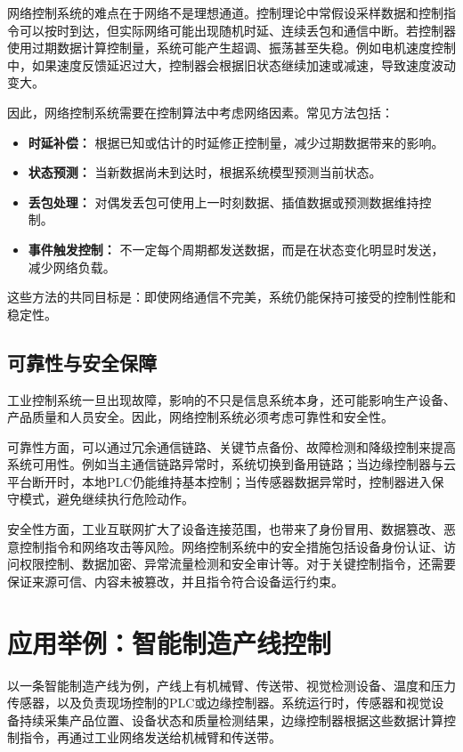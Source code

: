 \documentclass[UTF8,a4paper,zihao=-4]{ctexart}
\begin{document}
网络控制系统的难点在于网络不是理想通道。控制理论中常假设采样数据和控制指令可以按时到达，但实际网络可能出现随机时延、连续丢包和通信中断。若控制器使用过期数据计算控制量，系统可能产生超调、振荡甚至失稳。例如电机速度控制中，如果速度反馈延迟过大，控制器会根据旧状态继续加速或减速，导致速度波动变大。

因此，网络控制系统需要在控制算法中考虑网络因素。常见方法包括：

\begin{itemize}
  \item \textbf{时延补偿：} 根据已知或估计的时延修正控制量，减少过期数据带来的影响。
  \item \textbf{状态预测：} 当新数据尚未到达时，根据系统模型预测当前状态。
  \item \textbf{丢包处理：} 对偶发丢包可使用上一时刻数据、插值数据或预测数据维持控制。
  \item \textbf{事件触发控制：} 不一定每个周期都发送数据，而是在状态变化明显时发送，减少网络负载。
\end{itemize}

这些方法的共同目标是：即使网络通信不完美，系统仍能保持可接受的控制性能和稳定性。

\subsection{可靠性与安全保障}

工业控制系统一旦出现故障，影响的不只是信息系统本身，还可能影响生产设备、产品质量和人员安全。因此，网络控制系统必须考虑可靠性和安全性。

可靠性方面，可以通过冗余通信链路、关键节点备份、故障检测和降级控制来提高系统可用性。例如当主通信链路异常时，系统切换到备用链路；当边缘控制器与云平台断开时，本地PLC仍能维持基本控制；当传感器数据异常时，控制器进入保守模式，避免继续执行危险动作。

安全性方面，工业互联网扩大了设备连接范围，也带来了身份冒用、数据篡改、恶意控制指令和网络攻击等风险。网络控制系统中的安全措施包括设备身份认证、访问权限控制、数据加密、异常流量检测和安全审计等。对于关键控制指令，还需要保证来源可信、内容未被篡改，并且指令符合设备运行约束。

\section{应用举例：智能制造产线控制}

以一条智能制造产线为例，产线上有机械臂、传送带、视觉检测设备、温度和压力传感器，以及负责现场控制的PLC或边缘控制器。系统运行时，传感器和视觉设备持续采集产品位置、设备状态和质量检测结果，边缘控制器根据这些数据计算控制指令，再通过工业网络发送给机械臂和传送带。
\end{document}
